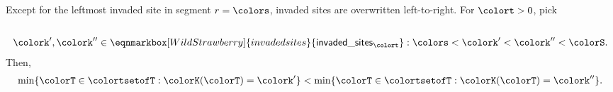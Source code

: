 \begin{lemma}
\label{thm:tilted-invading-overwrite-order}
Except for the leftmost invaded site in segment $r=\colors$, invaded sites are overwritten left-to-right. For $\colort > 0$, pick
\begin{align*}
\\
\colork',\colork''
\in
\eqnmarkbox[WildStrawberry]{invadedsites}{
  \mathsf{invaded\_sites}_{\colort}
}
: \colors < \colork' < \colork'' < \colorS.
\end{align*}
\annotate[yshift=1em]{above,left}{invadedsites}{$\{
  \colork \in [0\twodots\colorS)
  : \colorHcal_{\colort - 1}(\colork) \neq \colorHcal_{\colort}(\colork)
\}$}
Then,
\begin{align*}
\min\{
  \colorT \in \colortsetofT
  : \colorK(\colorT) = \colork'
\}
<
\min\{
  \colorT \in \colortsetofT
  : \colorK(\colorT) = \colork''
\}.
\end{align*}

\end{lemma}

